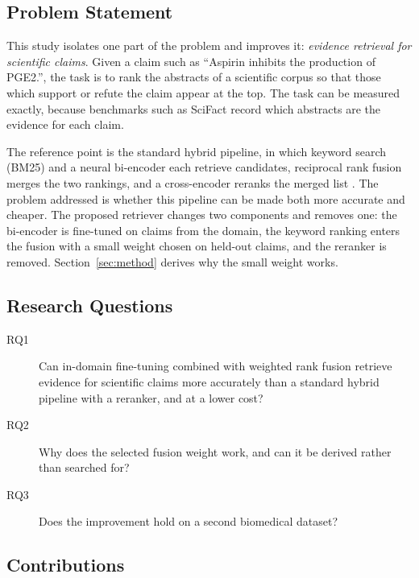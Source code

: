 \subsection{Problem Statement}
\label{sec:problem}

This study isolates one part of the problem and improves it: \emph{evidence retrieval for
scientific claims}. Given a claim such as ``Aspirin inhibits the production of PGE2.'', the
task is to rank the abstracts of a scientific corpus so that those which support or refute
the claim appear at the top. The task can be measured exactly, because benchmarks such as
SciFact \parencite{wadden2020scifact} record which abstracts are the evidence for each claim.

The reference point is the standard hybrid pipeline, in which keyword search (BM25) and a
neural bi-encoder each retrieve candidates, reciprocal rank fusion merges the two rankings,
and a cross-encoder reranks the merged list \parencite{chen2022hybrid,bruch2024fusion}. The
problem addressed is whether this pipeline can be made both more accurate and cheaper. The
proposed retriever changes two components and removes one: the bi-encoder is fine-tuned on
claims from the domain, the keyword ranking enters the fusion with a small weight chosen on
held-out claims, and the reranker is removed. Section~\ref{sec:method} derives why the small
weight works.

\subsection{Research Questions}
\label{sec:rq}

\begin{description}
\item[RQ1] Can in-domain fine-tuning combined with weighted rank fusion retrieve evidence for
scientific claims more accurately than a standard hybrid pipeline with a reranker, and at a
lower cost?
\item[RQ2] Why does the selected fusion weight work, and can it be derived rather than
searched for?
\item[RQ3] Does the improvement hold on a second biomedical dataset?
\end{description}

\subsection{Contributions}
\label{sec:novelty}

